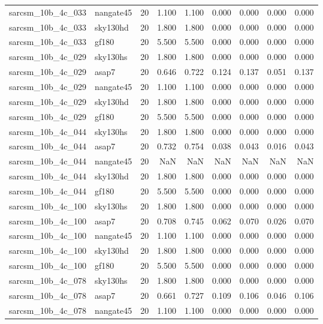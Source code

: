 \begin{tabular}{llrrrrrrr}
sarcsm\_10b\_4c\_033 & nangate45 & 20 & 1.100 & 1.100 & 0.000 & 0.000 & 0.000 & 0.000 \\
sarcsm\_10b\_4c\_033 & sky130hd & 20 & 1.800 & 1.800 & 0.000 & 0.000 & 0.000 & 0.000 \\
sarcsm\_10b\_4c\_033 & gf180 & 20 & 5.500 & 5.500 & 0.000 & 0.000 & 0.000 & 0.000 \\
sarcsm\_10b\_4c\_029 & sky130hs & 20 & 1.800 & 1.800 & 0.000 & 0.000 & 0.000 & 0.000 \\
sarcsm\_10b\_4c\_029 & asap7 & 20 & 0.646 & 0.722 & 0.124 & 0.137 & 0.051 & 0.137 \\
sarcsm\_10b\_4c\_029 & nangate45 & 20 & 1.100 & 1.100 & 0.000 & 0.000 & 0.000 & 0.000 \\
sarcsm\_10b\_4c\_029 & sky130hd & 20 & 1.800 & 1.800 & 0.000 & 0.000 & 0.000 & 0.000 \\
sarcsm\_10b\_4c\_029 & gf180 & 20 & 5.500 & 5.500 & 0.000 & 0.000 & 0.000 & 0.000 \\
sarcsm\_10b\_4c\_044 & sky130hs & 20 & 1.800 & 1.800 & 0.000 & 0.000 & 0.000 & 0.000 \\
sarcsm\_10b\_4c\_044 & asap7 & 20 & 0.732 & 0.754 & 0.038 & 0.043 & 0.016 & 0.043 \\
sarcsm\_10b\_4c\_044 & nangate45 & 20 & NaN & NaN & NaN & NaN & NaN & NaN \\
sarcsm\_10b\_4c\_044 & sky130hd & 20 & 1.800 & 1.800 & 0.000 & 0.000 & 0.000 & 0.000 \\
sarcsm\_10b\_4c\_044 & gf180 & 20 & 5.500 & 5.500 & 0.000 & 0.000 & 0.000 & 0.000 \\
sarcsm\_10b\_4c\_100 & sky130hs & 20 & 1.800 & 1.800 & 0.000 & 0.000 & 0.000 & 0.000 \\
sarcsm\_10b\_4c\_100 & asap7 & 20 & 0.708 & 0.745 & 0.062 & 0.070 & 0.026 & 0.070 \\
sarcsm\_10b\_4c\_100 & nangate45 & 20 & 1.100 & 1.100 & 0.000 & 0.000 & 0.000 & 0.000 \\
sarcsm\_10b\_4c\_100 & sky130hd & 20 & 1.800 & 1.800 & 0.000 & 0.000 & 0.000 & 0.000 \\
sarcsm\_10b\_4c\_100 & gf180 & 20 & 5.500 & 5.500 & 0.000 & 0.000 & 0.000 & 0.000 \\
sarcsm\_10b\_4c\_078 & sky130hs & 20 & 1.800 & 1.800 & 0.000 & 0.000 & 0.000 & 0.000 \\
sarcsm\_10b\_4c\_078 & asap7 & 20 & 0.661 & 0.727 & 0.109 & 0.106 & 0.046 & 0.106 \\
sarcsm\_10b\_4c\_078 & nangate45 & 20 & 1.100 & 1.100 & 0.000 & 0.000 & 0.000 & 0.000 \\

\end{tabular}
